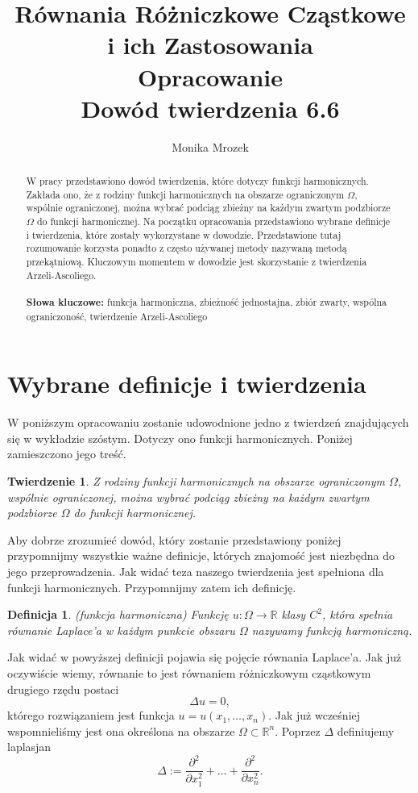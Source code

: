 \documentclass[12pt]{article}
\title{Równania Różniczkowe Cząstkowe i ich Zastosowania \\
Opracowanie \\
Dowód twierdzenia 6.6}
\author{Monika Mrozek}
\newtheorem{theorem}{Twierdzenie}
\newtheorem{definition}{Definicja}
\begin{document}
\maketitle
\begin{abstract}
W pracy przedstawiono dowód twierdzenia, które dotyczy funkcji harmonicznych. Zakłada ono, że z rodziny funkcji harmonicznych na obszarze ograniczonym $\Omega$, wspólnie ograniczonej, można wybrać podciąg zbieżny na każdym zwartym podzbiorze $\Omega$ do funkcji harmonicznej. Na początku opracowania przedstawiono wybrane definicje i twierdzenia, które zostały wykorzystane w dowodzie. Przedstawione tutaj rozumowanie korzysta ponadto z często używanej metody nazywaną metodą przekątniową. Kluczowym momentem w dowodzie jest skorzystanie z twierdzenia Arzeli-Ascoliego. \\ \\
\textbf{Słowa kluczowe:} funkcja harmoniczna, zbieżność jednostajna, zbiór zwarty, wspólna ograniczoność, twierdzenie Arzeli-Ascoliego
\end{abstract}

\section{Wybrane definicje i twierdzenia}

W poniższym opracowaniu zostanie udowodnione jedno z twierdzeń znajdujących się w wykładzie szóstym. Dotyczy ono funkcji harmonicznych. Poniżej zamieszczono jego treść. 
\begin{theorem}
Z rodziny funkcji harmonicznych na obszarze ograniczonym $\Omega$, wspólnie ograniczonej, można wybrać podciąg zbieżny na każdym
zwartym podzbiorze $\Omega$ do funkcji harmonicznej.
\end{theorem}

Aby dobrze zrozumieć dowód, który zostanie przedstawiony poniżej przypomnijmy wszystkie ważne definicje, których znajomość jest niezbędna do jego przeprowadzenia. Jak widać teza naszego twierdzenia jest spełniona dla funkcji harmonicznych. Przypomnijmy zatem ich definicję.

\begin{definition}{(funkcja harmoniczna)}
Funkcję $u: \Omega \rightarrow \mathbb{R}$ klasy $C^2$, która spełnia równanie Laplace'a w każdym punkcie obszaru $\Omega$ nazywamy funkcją harmoniczną.
\end{definition}

Jak widać w powyższej definicji pojawia się pojęcie równania Laplace'a. Jak już oczywiście wiemy, równanie to jest równaniem różniczkowym cząstkowym drugiego rzędu postaci 
$$\Delta u=0,$$
którego rozwiązaniem jest funkcja $u = u(x_1,\ldots, x_n)$. Jak już wcześniej wspomnieliśmy jest ona określona na obszarze $\Omega \subset \mathbb{R}^n$. Poprzez $\Delta$ definiujemy laplasjan
\begin{equation*}
\Delta :=\dfrac{\partial^2}{\partial x_1^2}+\ldots+\dfrac{\partial^2}{\partial x_n^2}.
\end{equation*}
\end{document}
